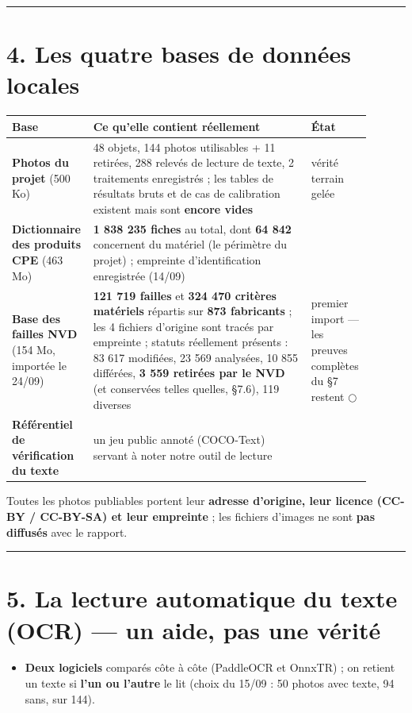 \documentclass[11pt,a4paper]{article}
\newcommand{\fait}{\textcolor{green!45!black}{\ding{51}}}      %
\newcommand{\afaire}{\textcolor{orange!85!black}{$\bigcirc$}}  %
\begin{document}
\medskip\hrule\medskip
\section*{4. Les quatre bases de données locales}
\sloppy
\begin{longtable}{|p{0.148\linewidth}|p{0.590\linewidth}|p{0.159\linewidth}|}
\hline
\textbf{Base} & \textbf{Ce qu'elle contient réellement} & \textbf{État} \\ \hline
\endhead
\textbf{Photos du projet} (500 Ko) & 48 objets, 144 photos utilisables + 11 retirées, 288 relevés de lecture de texte, 2 traitements enregistrés ; les tables de résultats bruts et de cas de calibration existent mais sont \textbf{encore vides} & \fait vérité terrain gelée \\ \hline
\textbf{Dictionnaire des produits CPE} (463 Mo) & \textbf{1 838 235 fiches} au total, dont \textbf{64 842} concernent du matériel (le périmètre du projet) ; empreinte d'identification enregistrée (14/09) & \fait \\ \hline
\textbf{Base des failles NVD} (154 Mo, importée le 24/09) & \textbf{121 719 failles} et \textbf{324 470 critères matériels} répartis sur \textbf{873 fabricants} ; les 4 fichiers d'origine sont tracés par empreinte ; statuts réellement présents : 83 617 modifiées, 23 569 analysées, 10 855 différées, \textbf{3 559 retirées par le NVD} (et conservées telles quelles, §7.6), 119 diverses & \fait premier import — les preuves complètes du §7 restent \afaire \\ \hline
\textbf{Référentiel de vérification du texte} & un jeu public annoté (COCO-Text) servant à noter notre outil de lecture & \fait \\ \hline
\end{longtable}
Toutes les photos publiables portent leur \textbf{adresse d'origine, leur licence (CC-BY / CC-BY-SA) et leur empreinte} ; les fichiers d'images ne sont \textbf{pas diffusés} avec le rapport.

\medskip\hrule\medskip
\section*{5. La lecture automatique du texte (OCR) — un aide, pas une vérité}
\begin{itemize}  \item \textbf{Deux logiciels} comparés côte à côte (PaddleOCR et OnnxTR) ; on retient un texte si \textbf{l'un ou l'autre} le lit (choix du 15/09 : 50 photos avec texte, 94 sans, sur 144).
\end{itemize}
\end{document}
